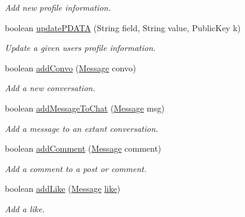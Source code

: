 \begin{DoxyCompactItemize}
\begin{DoxyCompactList}\small\item\em Add new profile information. \end{DoxyCompactList}\item 
boolean \hyperlink{classballmerpeak_1_1turtlenet_1_1server_1_1Database_a54a5e6c02389fb8f3528bf503019f7fe}{update\-P\-D\-A\-T\-A} (String field, String value, Public\-Key k)
\begin{DoxyCompactList}\small\item\em Update a given users profile information. \end{DoxyCompactList}\item 
boolean \hyperlink{classballmerpeak_1_1turtlenet_1_1server_1_1Database_a4a18cb43547e71e48bbf7269b3e5d560}{add\-Convo} (\hyperlink{classballmerpeak_1_1turtlenet_1_1shared_1_1Message}{Message} convo)
\begin{DoxyCompactList}\small\item\em Add a new conversation. \end{DoxyCompactList}\item 
boolean \hyperlink{classballmerpeak_1_1turtlenet_1_1server_1_1Database_a42de72fca336efc18a3c486749289b50}{add\-Message\-To\-Chat} (\hyperlink{classballmerpeak_1_1turtlenet_1_1shared_1_1Message}{Message} msg)
\begin{DoxyCompactList}\small\item\em Add a message to an extant conversation. \end{DoxyCompactList}\item 
boolean \hyperlink{classballmerpeak_1_1turtlenet_1_1server_1_1Database_a1bfae51747f69a2dd125d9c915b980d4}{add\-Comment} (\hyperlink{classballmerpeak_1_1turtlenet_1_1shared_1_1Message}{Message} comment)
\begin{DoxyCompactList}\small\item\em Add a comment to a post or comment. \end{DoxyCompactList}\item 
boolean \hyperlink{classballmerpeak_1_1turtlenet_1_1server_1_1Database_af22fa4b19c7863929894a3ed278a174c}{add\-Like} (\hyperlink{classballmerpeak_1_1turtlenet_1_1shared_1_1Message}{Message} \hyperlink{classballmerpeak_1_1turtlenet_1_1server_1_1Database_ac2c2361722304a6446d5cd01cb0c5d3b}{like})
\begin{DoxyCompactList}\small\item\em Add a like. \end{DoxyCompactList}\item 

\end{DoxyCompactItemize}
